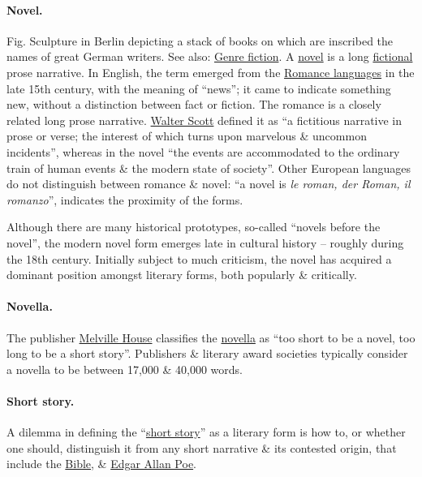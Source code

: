 \documentclass[oneside]{book}
\numberwithin{equation}{section}
\begin{document}
\paragraph{Novel.} \textsf{Fig. Sculpture in Berlin depicting a stack of books on which are inscribed the names of great German writers.} See also: \href{https://en.wikipedia.org/wiki/Genre_fiction}{Genre fiction}. A \href{https://en.wikipedia.org/wiki/Novel}{novel} is a long \href{https://en.wikipedia.org/wiki/Fictional}{fictional} prose narrative. In English, the term emerged from the \href{https://en.wikipedia.org/wiki/Romance_language}{Romance languages} in the late 15th century, with the meaning of ``news''; it came to indicate something new, without a distinction between fact or fiction. The romance is a closely related long prose narrative. \href{https://en.wikipedia.org/wiki/Walter_Scott}{Walter Scott} defined it as ``a fictitious narrative in prose or verse; the interest of which turns upon marvelous \& uncommon incidents'', whereas in the novel ``the events are accommodated to the ordinary train of human events \& the modern state of society''. Other European languages do not distinguish between romance \& novel: ``a novel is \textit{le roman, der Roman, il romanzo}'', indicates the proximity of the forms.

Although there are many historical prototypes, so-called ``novels before the novel'', the modern novel form emerges late in cultural history -- roughly during the 18th century. Initially subject to much criticism, the novel has acquired a dominant position amongst literary forms, both popularly \& critically.

\paragraph{Novella.} The publisher \href{https://en.wikipedia.org/wiki/Melville_House_Publishing}{Melville House} classifies the \href{https://en.wikipedia.org/wiki/Novella}{novella} as ``too short to be a novel, too long to be a short story''. Publishers \& literary award societies typically consider a novella to be between 17,000 \& 40,000 words.

\paragraph{Short story.} A dilemma in defining the ``\href{https://en.wikipedia.org/wiki/Short_story}{short story}'' as a literary form is how to, or whether one should, distinguish it from any short narrative \& its contested origin, that include the \href{https://en.wikipedia.org/wiki/Bible}{Bible}, \& \href{https://en.wikipedia.org/wiki/Edgar_Allan_Poe}{Edgar Allan Poe}.
\end{document}
